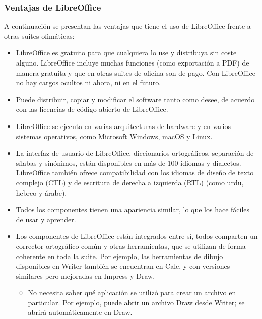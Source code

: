 \documentclass[letterpaper,10pt,spanish]{sphinxmanual}
\begin{document}
\subsubsection{Ventajas de LibreOffice}
\label{\detokenize{1_guias/10ofimatica/G1012:ventajas-de-libreoffice}}
\sphinxAtStartPar
\sphinxfootnotemark[16] A continuación se presentan las ventajas que tiene el uso de LibreOffice frente a otras suites ofimáticas:
\begin{itemize}
\item {} 
\sphinxAtStartPar
{} LibreOffice es gratuito para que cualquiera lo use y distribuya sin coste alguno. LibreOffice incluye muchas funciones (como exportación a PDF) de manera gratuita y que en otras suites de oficina son de pago. Con LibreOffice no hay cargos ocultos ni ahora, ni en el futuro.

\item {} 
\sphinxAtStartPar
{} Puede distribuir, copiar y modificar el software tanto como desee, de acuerdo con las licencias de código abierto de LibreOffice.

\item {} 
\sphinxAtStartPar
{} LibreOffice se ejecuta en varias arquitecturas de hardware y en varios sistemas operativos, como Microsoft Windows, macOS y Linux.

\item {} 
\sphinxAtStartPar
{} La interfaz de usuario de LibreOffice, diccionarios ortográficos, separación de sílabas y sinónimos, están disponibles en más de 100 idiomas y dialectos. LibreOffice también ofrece compatibilidad con los idiomas de diseño de texto complejo (CTL) y de escritura de derecha a izquierda (RTL) (como urdu, hebreo y árabe).

\item {} 
\sphinxAtStartPar
{} Todos los componentes tienen una apariencia similar, lo que los hace fáciles de usar y aprender.

\item {} 
\sphinxAtStartPar
{} Los componentes de LibreOffice están integrados entre sí, todos comparten un corrector ortográfico común y otras herramientas, que se utilizan de forma coherente en toda la suite. Por ejemplo, las herramientas de dibujo disponibles en Writer también se encuentran en Calc, y con versiones similares pero mejoradas en Impress y Draw.
\begin{itemize}
\item {} 
\sphinxAtStartPar
No necesita saber qué aplicación se utilizó para crear un archivo en particular. Por ejemplo, puede abrir un archivo Draw desde Writer; se abrirá automáticamente en Draw.


\end{itemize}
\end{itemize}
\end{document}
